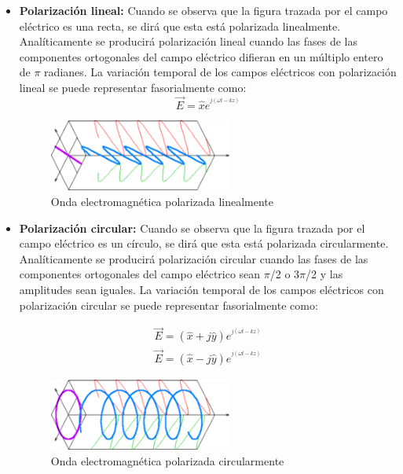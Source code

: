 \begin{itemize}
\item\textbf{Polarización lineal: }Cuando se observa que la figura trazada por el campo eléctrico es una recta, se dirá que esta está polarizada linealmente. Analíticamente se producirá polarización lineal cuando las fases de las componentes ortogonales del campo eléctrico difieran en un múltiplo entero de $\pi$ radianes. La variación temporal de los campos eléctricos con polarización lineal se puede representar fasorialmente como:
\begin{equation}
	\vec{E} = \hat{x}e^{^{j(\omega t-kz)}}
	\label{eq:pollineal}
\end{equation}
\begin{figure}[h]
    \centering
        \includegraphics[width=6cm]{archivos/polarizacion/lineal}
        \caption{Onda electromagnética polarizada linealmente}
        \label{fig:pollin}
\end{figure}
\item\textbf{Polarización circular: }Cuando se observa que la figura trazada por el campo eléctrico es un círculo, se dirá que esta está polarizada circularmente. Analíticamente se producirá polarización circular cuando las fases de las componentes ortogonales del campo eléctrico sean $\pi$/2 o 3$\pi$/2 y las amplitudes sean iguales. La variación temporal de los campos eléctricos con polarización circular se puede representar fasorialmente como:

\begin{subequations}
	\begin{eqnarray}
		\vec{E} = (\hat{x}+j\hat{y})e^{^{j(\omega t-kz)}} \label{ecu:polcirlev} \\ %
		\vec{E} = (\hat{x}-j\hat{y})e^{^{j(\omega t-kz)}} \label{ecu:polcirdex} 
	\end{eqnarray}
\end{subequations}

\begin{figure}[h]
    \centering
        \includegraphics[width=6cm]{archivos/polarizacion/circular}
        \caption{Onda electromagnética polarizada circularmente}
        \label{fig:polcir}
\end{figure}


\end{itemize}
